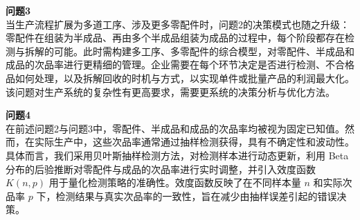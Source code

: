 \documentclass{article}
\begin{document}
	\vspace{1em}
	\noindent
	\textbf{问题3}\\
	当生产流程扩展为多道工序、涉及更多零配件时，问题2的决策模式也随之升级：零配件在组装为半成品、再由多个半成品组装为成品的过程中，每个阶段都存在检测与拆解的可能。此时需构建多工序、多零配件的综合模型，对零配件、半成品和成品的次品率进行更精细的管理。企业需要在每个环节决定是否进行检测、不合格品如何处理，以及拆解回收的时机与方式，以实现单件或批量产品的利润最大化。该问题对生产系统的复杂性有更高要求，需要更系统的决策分析与优化方法。
	
	\vspace{1em}
	\noindent
	\textbf{问题4}\\
	在前述问题2与问题3中，零配件、半成品和成品的次品率均被视为固定已知值。然而，在实际生产中，这些次品率通常通过抽样检测获得，具有不确定性和波动性。具体而言，我们采用贝叶斯抽样检测方法，对检测样本进行动态更新，利用 Beta 分布的后验推断对零配件与成品的次品率进行实时调整，并引入效度函数 $K(n, p)$ 用于量化检测策略的准确性。效度函数反映了在不同样本量 $n$ 和实际次品率 $p$ 下，检测结果与真实次品率的一致性，旨在减少由抽样误差引起的错误决策。
\end{document}
